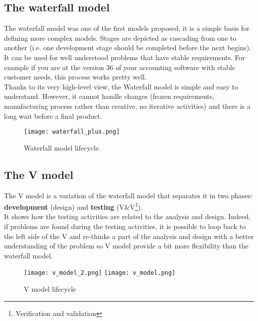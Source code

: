 \subsection{The waterfall model} The waterfall model was one of the first
models proposed, it is a simple basis for defining more complex models. Stages are depicted as cascading from one to another (i.e. one development stage should be completed before the next begins).\\

It can be used for well understood problems that have stable requirements. For example if you are at the version 36 of your accounting software with stable customer needs, this process works pretty well.\\

Thanks to its very high-level view, the Waterfall model is simple and easy to understand.
However, it cannot handle changes (frozen requirements, manufacturing process rather than creative, no iterative activities) and there is a long wait before a final product.

\begin{figure}[!ht]
    \centering
    \texttt{[image: waterfall\_plus.png]}
    \caption{Waterfall model lifecycle}
\end{figure}
\FloatBarrier{}

\subsection{The V model}

The V model is a variation of the waterfall model that separates it in two phases: \textbf{development} (design) and \textbf{testing} (V\&V\footnote{Verification and
validation}).\\

It shows how the testing activities are related to the analysis and design. Indeed, if problems are found during the testing activities, it is possible to loop back to the left side of the V and re-thinks a part of the analysis and design with a better understanding of the problem so V model provide a bit more flexibility than the 
waterfall model.

\begin{figure}[!ht]
    \centering
    \texttt{[image: v\_model\_2.png]}
    \texttt{[image: v\_model.png]}
    \caption{V model lifecycle}
\end{figure}
\FloatBarrier{}

